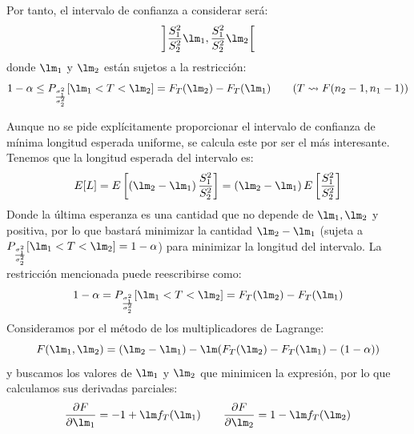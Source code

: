 \begin{ejercicio}
    Por tanto, el intervalo de confianza a considerar será:
    \begin{equation*}
        \left]\frac{S_1^2}{S_2^2}\lm_1,\frac{S_1^2}{S_2^2}\lm_2\right[
    \end{equation*}
    donde $\lm_1$ y $\lm_2$ están sujetos a la restricción:
    \begin{equation*}
        1-\alpha \leq P_{\frac{\sigma_1^2}{\sigma_2^2}}[\lm_1<T<\lm_2] = F_T(\lm_2) - F_T(\lm_1) \qquad (T\rightsquigarrow F(n_2-1,n_1-1))
    \end{equation*}

    Aunque no se pide explícitamente proporcionar el intervalo de confianza de mínima longitud esperada uniforme, se calcula este por ser el más interesante.
    Tenemos que la longitud esperada del intervalo es:
    \begin{equation*}
        E[L] = E\left[\left(\lm_2-\lm_1\right)\frac{S_1^2}{S_2^2}\right] = \left(\lm_2-\lm_1\right)E\left[\frac{S_1^2}{S_2^2}\right]
    \end{equation*}
    Donde la última esperanza es una cantidad que no depende de $\lm_1,\lm_2$ y positiva, por lo que bastará minimizar la cantidad $\lm_2-\lm_1$ (sujeta a $P_{\frac{\sigma_1^2}{\sigma_2^2}}[\lm_1<T<\lm_2]=1-\alpha$) para minimizar la longitud del intervalo. La restricción mencionada puede reescribirse como:
    \begin{equation*}
        1-\alpha = P_{\frac{\sigma_1^2}{\sigma_2^2}}[\lm_1<T<\lm_2] = F_T(\lm_2) - F_T(\lm_1)
    \end{equation*}
    Consideramos por el método de los multiplicadores de Lagrange:
    \begin{equation*}
        F(\lm_1,\lm_2) = (\lm_2-\lm_1) - \lm(F_T(\lm_2) - F_T(\lm_1) - (1-\alpha))
    \end{equation*}
    y buscamos los valores de $\lm_1$ y $\lm_2$ que minimicen la expresión, por lo que calculamos sus derivadas parciales:
    \begin{equation*}
        \dfrac{\partial F}{\partial \lm_1} = -1+\lm f_T(\lm_1) \qquad \dfrac{\partial F}{\partial \lm_2} = 1-\lm f_T(\lm_2)
    \end{equation*}


\end{ejercicio}
